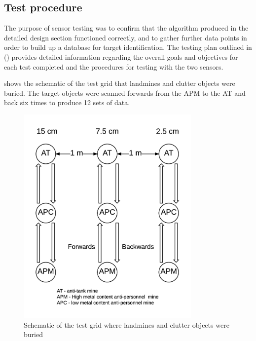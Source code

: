 \documentclass[main.tex]{subfiles}
\begin{document}
\subsection{Test procedure}
The purpose of sensor testing was to confirm that the algorithm produced in the detailed design section functioned correctly, and to gather further data points in order to build up a database for target identification. The testing plan outlined in () provides detailed information regarding the overall goals and objectives for each test completed and the procedures for testing with the two sensors. 

 shows the schematic of the test grid that landmines and clutter objects were buried. The target objects were scanned forwards from the APM to the AT and back six times to produce 12 sets of data. 

\begin{figure}[ht]
\includegraphics[width=0.8\textwidth]{5-Testing/testlane.png}
\centering
\caption[Schematic of test grid]{Schematic of the test grid where landmines and clutter objects were buried}
\end{figure}
\end{document}
